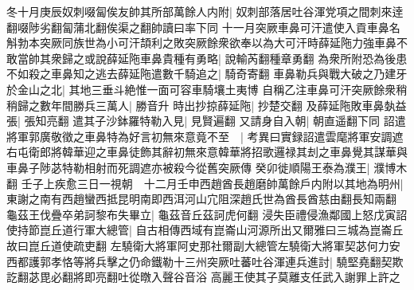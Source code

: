 冬十月庚辰奴刺啜匐俟友帥其所部萬餘人内附|{
	奴刺部落居吐谷渾党項之間刺來逹翻啜陟劣翻匐蒲北翻俟渠之翻帥讀曰率下同}
十一月突厥車鼻可汗遣使入貢車鼻名斛勃本突厥同族世為小可汗頡利之敗突厥餘衆欲奉以為大可汗時薛延陁力強車鼻不敢當帥其衆歸之或說薛延陁車鼻貴種有勇略|{
	說輸芮翻種章勇翻}
為衆所附恐為後患不如殺之車鼻知之逃去薛延陁遣數千騎追之|{
	騎奇寄翻}
車鼻勒兵與戰大破之乃建牙於金山之北|{
	其地三垂斗絶惟一面可容車騎壤土夷博}
自稱乙注車鼻可汗突厥餘衆稍稍歸之數年間勝兵三萬人|{
	勝音升}
時出抄掠薛延陁|{
	抄楚交翻}
及薛延陁敗車鼻埶益張|{
	張知亮翻}
遣其子沙鉢羅特勒入見|{
	見賢遍翻}
又請身自入朝|{
	朝直遥翻下同}
詔遣將軍郭廣敬徵之車鼻特為好言初無來意竟不至　|{
	考異曰實録詔遣雲麾將軍安調遮右屯衛郎將韓華迎之車鼻徒飾其辭初無來意韓華將招歌邏禄其刦之車鼻覺其謀華與車鼻子陟苾特勒相射而死調遮亦被殺今從舊突厥傳}
癸卯徙順陽王泰為濮王|{
	濮博木翻}
壬子上疾愈三日一視朝　十二月壬申西趙酋長趙磨帥萬餘戶内附以其地為明州|{
	東謝之南有西趙蠻西抵昆明南即西洱河山宂阻深趙氏世為酋長酋慈由翻長知兩翻}
龜茲王伐疊卒弟訶黎布失畢立|{
	龜茲音丘茲訶虎何翻}
浸失臣禮侵漁鄰國上怒戊寅詔使持節崑丘道行軍大總管|{
	自古相傳西域有崑崙山河源所出又爾雅曰三城為崑崙丘故曰崑丘道使疏吏翻}
左驍衛大將軍阿史那社爾副大總管左驍衛大將軍契苾何力安西都護郭孝恪等將兵擊之仍命鐵勒十三州突厥吐蕃吐谷渾連兵進討|{
	驍堅堯翻契欺訖翻苾毘必翻將即亮翻吐從暾入聲谷音浴}
高麗王使其子莫離支任武入謝罪上許之


